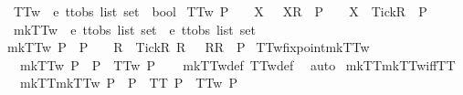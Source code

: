 \begin{isabellebody}
%
\endisadelimproof
\isanewline
\isanewline
\isanewline
{}\isamarkupfalse%
\ TT{}w\ {\isacharcolon}{\isacharcolon}\ {\isachardoublequoteopen}{\isacharprime}e\ ttobs\ list\ set\ {\isasymRightarrow}\ bool{\isachardoublequoteclose}\ \isanewline
{\isachardoublequoteopen}TT{}w\ P\ {\isacharequal}\ {\isacharparenleft}{\isasymforall}\ {\isasymrho}\ X{\isachardot}\ {\isasymrho}\ {\isacharat}\ {\isacharbrackleft}{\isacharbrackleft}X{\isacharbrackright}\isactrlsub R{\isacharbrackright}\ {\isasymin}\ P\ {\isasymlongrightarrow}\ {\isasymrho}\ {\isacharat}\ {\isacharbrackleft}{\isacharbrackleft}X\ {\isasymunion}\ {\isacharbraceleft}Tick{\isacharbraceright}{\isacharbrackright}\isactrlsub R{\isacharbrackright}\ {\isasymin}\ P{\isacharparenright}{\isachardoublequoteclose}\isanewline
\isanewline
{}\isamarkupfalse%
\ mkTT{}w\ {\isacharcolon}{\isacharcolon}\ {\isachardoublequoteopen}{\isacharprime}e\ ttobs\ list\ set\ {\isasymRightarrow}\ {\isacharprime}e\ ttobs\ list\ set{\isachardoublequoteclose}\ \isanewline
{\isachardoublequoteopen}mkTT{}w\ P\ {\isacharequal}\ P\ {\isasymunion}\ {\isacharbraceleft}{\isasymrho}\ {\isacharat}\ {\isacharbrackleft}{\isacharbrackleft}R\ {\isasymunion}\ {\isacharbraceleft}Tick{\isacharbraceright}{\isacharbrackright}\isactrlsub R{\isacharbrackright}{\isacharbar}{\isasymrho}\ R{\isachardot}\ {\isasymrho}\ {\isacharat}\ {\isacharbrackleft}{\isacharbrackleft}R{\isacharbrackright}\isactrlsub R{\isacharbrackright}\ {\isasymin}\ P{\isacharbraceright}{\isachardoublequoteclose}\isanewline
\isanewline
{}\isamarkupfalse%
\ TT{}w{\isacharunderscore}fixpoint{\isacharunderscore}mkTT{}w{\isacharcolon}\isanewline
\ \ {\isachardoublequoteopen}{\isacharparenleft}mkTT{}w\ P\ {\isacharequal}\ P{\isacharparenright}\ {\isacharequal}\ TT{}w\ P{\isachardoublequoteclose}\isanewline
%
\isadelimproof
\ \ %
\endisadelimproof
%
\isatagproof
{}\isamarkupfalse%
\ mkTT{}w{\isacharunderscore}def\ TT{}w{\isacharunderscore}def\ \isamarkupfalse%
\ auto%
\endisatagproof
{\isafoldproof}%
%
\isadelimproof
\isanewline
%
\endisadelimproof
\isanewline
{}\isamarkupfalse%
\ mkTT{}{\isacharunderscore}mkTT{}w{\isacharunderscore}iff{\isacharunderscore}TT{}{}{\isacharcolon}\isanewline
\ \ {\isachardoublequoteopen}{\isacharparenleft}mkTT{}{\isacharparenleft}mkTT{}w\ P{\isacharparenright}\ {\isacharequal}\ P{\isacharparenright}\ {\isacharequal}\ {\isacharparenleft}TT{}\ P\ {\isasymand}\ TT{}w\ P{\isacharparenright}{\isachardoublequoteclose}\isanewline

\end{isabellebody}
